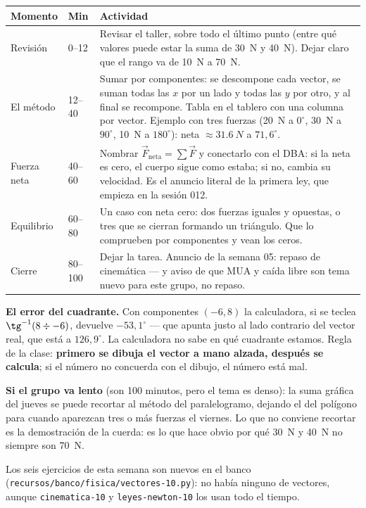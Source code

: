 \documentclass[11pt]{article}
\begin{document}
\begin{center}
{\renewcommand{\arraystretch}{1.3}
\begin{tabularx}{\linewidth}{@{}l l X@{}}
  \toprule
  \textbf{Momento} & \textbf{Min} & \textbf{Actividad}\\
  \midrule
  Revisión & 0--12 & Revisar el taller, sobre todo el último punto (entre qué valores puede
    estar la suma de \qty{30}{N} y \qty{40}{N}). Dejar claro que el rango va de \qty{10}{N}
    a \qty{70}{N}.\\
  El método & 12--40 & Sumar por componentes: se descompone cada vector, se suman todas
    las $x$ por un lado y todas las $y$ por otro, y al final se recompone. Tabla en el
    tablero con una columna por vector. Ejemplo con tres fuerzas
    (\qty{20}{N} a $0^\circ$, \qty{30}{N} a $90^\circ$, \qty{10}{N} a $180^\circ$):
    neta $\approx \qty{31,6}{N}$ a $71{,}6^\circ$.\\
  Fuerza neta & 40--60 & Nombrar $\vec{F}_{\text{neta}} = \sum \vec{F}$ y conectarlo con el
    DBA: si la neta es cero, el cuerpo sigue como estaba; si no, cambia su velocidad. Es el
    anuncio literal de la primera ley, que empieza en la sesión 012.\\
  Equilibrio & 60--80 & Un caso con neta cero: dos fuerzas iguales y opuestas, o tres que
    se cierran formando un triángulo. Que lo comprueben por componentes y vean los ceros.\\
  Cierre & 80--100 & Dejar la tarea. Anuncio de la semana 05: repaso de cinemática — y
    aviso de que MUA y caída libre son tema nuevo para este grupo, no repaso.\\
  \bottomrule
\end{tabularx}}
\end{center}

\begin{nota}
\textbf{El error del cuadrante.} Con componentes $(-6, 8)$ la calculadora, si se teclea
$\tg^{-1}(8 \div -6)$, devuelve $-53{,}1^\circ$ — que apunta justo al lado contrario del
vector real, que está a $126{,}9^\circ$. La calculadora no sabe en qué cuadrante estamos.
Regla de la clase: \textbf{primero se dibuja el vector a mano alzada, después se calcula}; si
el número no concuerda con el dibujo, el número está mal.
\end{nota}

\begin{nota}
\textbf{Si el grupo va lento} (son 100 minutos, pero el tema es denso): la suma gráfica del
jueves se puede recortar al método del paralelogramo, dejando el del polígono para cuando
aparezcan tres o más fuerzas el viernes. Lo que no conviene recortar es la demostración de la
cuerda: es lo que hace obvio por qué \qty{30}{N} y \qty{40}{N} no siempre son \qty{70}{N}.
\end{nota}

\begin{nota}
Los seis ejercicios de esta semana son nuevos en el banco
(\texttt{recursos/banco/fisica/vectores-10.py}): no había ninguno de vectores, aunque
\texttt{cinematica-10} y \texttt{leyes-newton-10} los usan todo el tiempo.
\end{nota}
\end{document}
